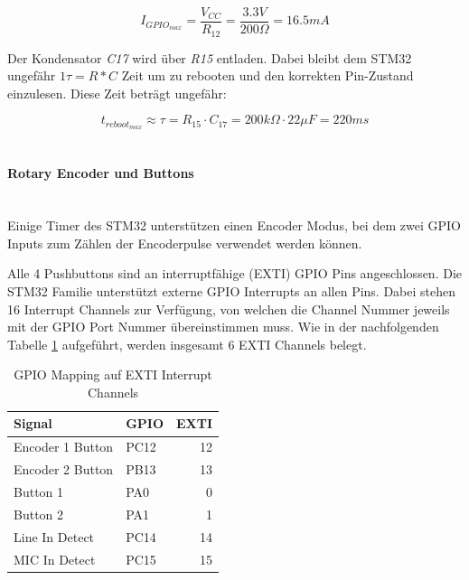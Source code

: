 \begin{equation}
I_{GPIO_{max}}=\frac{V_{CC}}{R_{12}}=\frac{3.3\si{V}}{200\si{\Omega}}=16.5\si{mA}
\end{equation}

Der Kondensator \textit{C17} wird über \textit{R15} entladen. Dabei bleibt dem STM32 ungefähr $1\tau=R*C$ Zeit um zu rebooten und den korrekten Pin-Zustand einzulesen. Diese Zeit beträgt ungefähr:

\begin{equation}
t_{reboot_{max}} \approx \tau = R_{15}\cdot C_{17} = 200\si{k\Omega}\cdot 22\si{\mu F}=220\si{ms}
\end{equation}
\\
\paragraph{Rotary Encoder und Buttons}\vspace{-0.3cm}\\
Einige Timer des STM32 unterstützen einen Encoder Modus, bei dem zwei GPIO Inputs zum Zählen der Encoderpulse verwendet werden können.

Alle 4 Pushbuttons sind an interruptfähige (EXTI) GPIO Pins angeschlossen. 
Die STM32 Familie unterstützt externe GPIO Interrupts an allen Pins. 
Dabei stehen 16 Interrupt Channels zur Verfügung, von welchen die Channel Nummer jeweils mit der GPIO Port Nummer übereinstimmen muss. 
Wie in der nachfolgenden Tabelle \ref{tab:EXTIPins} aufgeführt, werden insgesamt 6 EXTI Channels belegt.

\begin{table}[H]
	\centering
	\begin{tabular}{|l|l|r|}
	\hline
	\textbf{Signal}  & \textbf{GPIO} & \textbf{EXTI} \\ \hline
	Encoder 1 Button & PC12          & 12            \\ \hline
	Encoder 2 Button & PB13          & 13            \\ \hline
	Button 1         & PA0           & 0             \\ \hline
	Button 2         & PA1           & 1             \\ \hline
	Line In Detect   & PC14          & 14            \\ \hline
	MIC In Detect    & PC15          & 15            \\ \hline
	\end{tabular}
	\caption{GPIO Mapping auf EXTI Interrupt Channels}
	\label{tab:EXTIPins}
\end{table}




